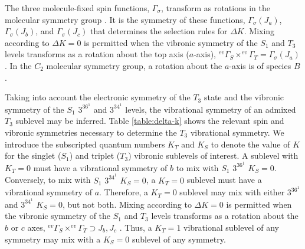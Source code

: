 \documentclass[12pt]{mitthesis}
\begin{document}
The three molecule-fixed spin functions, $\Gamma_{\sigma}$, transform
as rotations in the molecular symmetry group \cite{hougen64,
  stevens73}.  It is the symmetry of these functions,
$\Gamma_{\sigma}(J_a)$, $\Gamma_{\sigma}(J_b)$, and
$\Gamma_{\sigma}(J_c)$ that determines the selection rules for $\Delta
K$.  Mixing according to $\Delta K =0$ is permitted when the vibronic
symmetry of the $S_1$ and $T_3$ levels transforms as a rotation about
the top axis ($a$-axis), $^{ev}\Gamma_S \times ^{ev}\Gamma_T =
\Gamma_{\sigma}( J_a)$ \cite{stevens73}.  In the $C_2$ molecular
symmetry group, a rotation about the $a$-axis is of species $B$
\cite{bunker98}.

Taking into account the electronic symmetry of the $T_3$ state and the
vibronic symmetry of the $S_1$ $3^36^1$ and $3^34^1$ levels, the
vibrational symmetry of an admixed $T_3$ sublevel may be inferred.
Table \ref{table:delta-k} shows the relevant spin and vibronic
symmetries necessary to determine the $T_3$ vibrational symmetry. We
introduce the subscripted quantum numbers $K_T$ and $K_S$ to denote
the value of $K$ for the singlet ($S_1$) and triplet ($T_3$) vibronic
sublevels of interest.  A sublevel with $K_T=0$ must have a
vibrational symmetry of $b$ to mix with $S_1$ $3^36^1$ $K_S=0$.
Conversely, to mix with $S_1$ $3^34^1$ $K_S=0$, a $K_T=0$ sublevel
must have a vibrational symmetry of $a$.  Therefore, a $K_T=0$
sublevel may mix with either $3^36^1$ and $3^34^1$ $K_S=0$, but not
both.  Mixing according to $\Delta K =0$ is permitted when the
vibronic symmetry of the $S_1$ and $T_3$ levels transforms as a
rotation about the $b$ or $c$ axes, $^{ev}\Gamma_S \times
^{ev}\Gamma_T \supset J_b, J_c$ \cite{stevens73}.  Thus, a $K_T=1$
vibrational sublevel of any symmetry may mix with a $K_S=0$ sublevel
of any symmetry.
\end{document}
